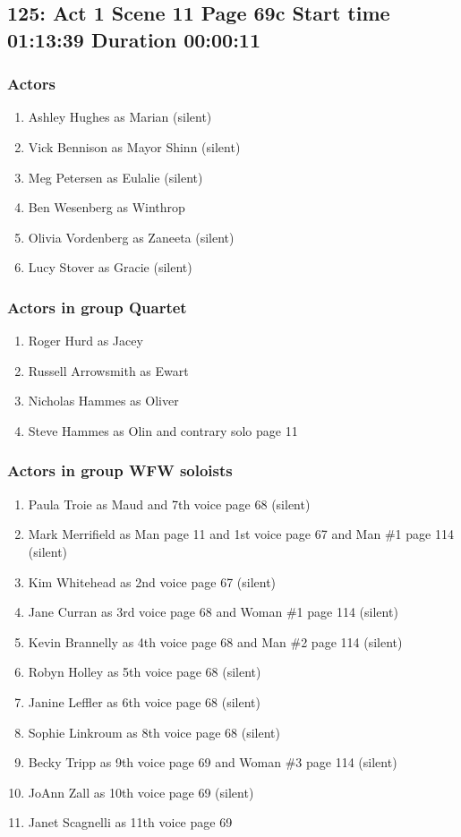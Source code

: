 \subsection{125: Act 1 Scene 11 Page 69c Start time 01:13:39 Duration 00:00:11}

\subsubsection{Actors}
\begin{enumerate}
\item Ashley Hughes as Marian (silent)
\item Vick Bennison as Mayor Shinn (silent)
\item Meg Petersen as Eulalie (silent)
\item Ben Wesenberg as Winthrop
\item Olivia Vordenberg as Zaneeta (silent)
\item Lucy Stover as Gracie (silent)
\end{enumerate}
\subsubsection{Actors in group Quartet}
\begin{enumerate}
\item Roger Hurd as Jacey
\item Russell Arrowsmith as Ewart
\item Nicholas Hammes as Oliver
\item Steve Hammes as Olin and contrary solo page 11
\end{enumerate}
\subsubsection{Actors in group WFW soloists}
\begin{enumerate}
\item Paula Troie as Maud and 7th voice page 68 (silent)
\item Mark Merrifield as Man page 11 and 1st voice page 67 and Man \#1 page 114 (silent)
\item Kim Whitehead as 2nd voice page 67 (silent)
\item Jane Curran as 3rd voice page 68 and Woman \#1 page 114 (silent)
\item Kevin Brannelly as 4th voice page 68 and Man \#2 page 114 (silent)
\item Robyn Holley as 5th voice page 68 (silent)
\item Janine Leffler as 6th voice page 68 (silent)
\item Sophie Linkroum as 8th voice page 68 (silent)
\item Becky Tripp as 9th voice page 69 and Woman \#3 page 114 (silent)
\item JoAnn Zall as 10th voice page 69 (silent)
\item Janet Scagnelli as 11th voice page 69
\end{enumerate}

